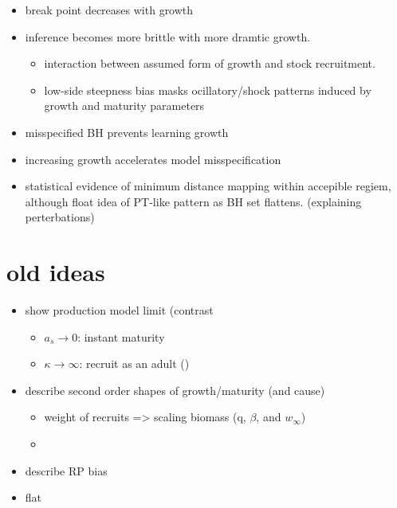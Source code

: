 \begin{itemize}
	\item break point decreases with growth
	\item inference becomes more brittle with more dramtic growth.
	\begin{itemize}
		\item interaction between assumed form of growth and stock recruitment. 
		\item low-side steepness bias masks ocillatory/shock patterns induced by growth and maturity parameters 
	\end{itemize}
	\item misspecified BH prevents learning growth
	\item increasing growth accelerates model misspecification
	\item statistical evidence of minimum distance mapping within accepible regiem, although float idea of PT-like pattern as BH set flattens. (explaining perterbations)
\end{itemize}

%
\section{old ideas}

%
\begin{itemize}
\item show production model limit (contrast %
\begin{itemize}
	\item $a_s\rightarrow0$: instant maturity
	\item $\kappa\rightarrow\infty$: recruit as an adult ()
\end{itemize}
\item describe second order shapes of growth/maturity (and cause)
\begin{itemize}
	\item weight of recruits => scaling biomass (q, $\beta$, and $w_\infty$)
	\item 
\end{itemize}
\item describe RP bias
\item flat 
\end{itemize}


